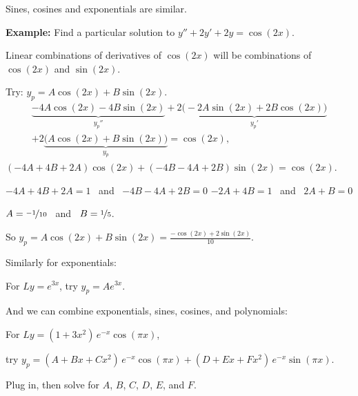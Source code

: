 \documentclass[10pt,aspectratio=169]{beamer}
\begin{document}
\begin{frame}
Sines, cosines and exponentials are similar.

\pause
\medskip

\textbf{Example:}
Find a particular solution to
\quad
$y''+2y'+2y = \cos (2x)$.

\medskip
\pause

Linear combinations of derivatives of $\cos(2x)$ will be combinations
of $\cos (2x)$ and $\sin (2x)$.

\medskip
\pause

Try:
\quad
$y_p = A \cos (2x) + B \sin (2x)$.
\pause
\begin{multline*}
\underbrace{-4 A \cos (2x) - 4 B \sin (2x)}_{y_p''}
+2 \underbrace{\bigl(-2A \sin (2x) + 2B \cos (2x)\bigr)}_{y_p'}
\\
+
2 \underbrace{\bigl(A \cos (2x) + B \sin (2x)\bigr)}_{y_p}
= \cos (2x) ,
\end{multline*}
\pause
\thus\quad
$(-4A+4B+2A) \cos(2x) +
(-4B-4A+2B) \sin(2x)
= \cos(2x)$.

\medskip
\pause
\thus \quad $-4A + 4B + 2A = 1$ ~and~
$-4B - 4A + 2B = 0$
\pause
\wthus
$-2A+4B =1$ ~and~ $2A+B=0$

\pause
\thus
\quad
$A=\nicefrac{-1}{10}$ ~and~ $B=\nicefrac{1}{5}$.

\medskip
\pause

So \quad
$\displaystyle
y_p = A \cos (2x) + B \sin (2x) = \frac{-\cos (2x) + 2 \sin (2x)}{10} .
$
\end{frame}

\begin{frame}
Similarly for exponentials:

\medskip

For
\quad $Ly = e^{3x}$, \quad try
$y_p = A e^{3x}$.

\medskip
\pause

And we can combine exponentials, sines, cosines, and polynomials:

\medskip
\pause

For
\quad
$Ly = (1+3x^2)\,e^{-x}\cos (\pi x)$,

\medskip
try
$y_p = (A + Bx + Cx^2)\,e^{-x} \cos (\pi x) + 
(D + Ex + Fx^2)\,e^{-x} \sin (\pi x)$.

\medskip
\pause

Plug in, then solve for $A$, $B$, $C$, $D$, $E$, and $F$.
\end{frame}
\end{document}

